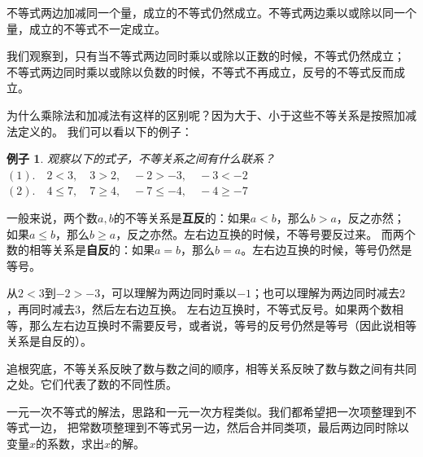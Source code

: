 \documentclass[12pt,UTF8]{ctexbook}
\newtheorem{ex}{例子}[section]
\begin{document}
不等式两边加减同一个量，成立的不等式仍然成立。不等式两边乘以或除以同一个量，成立的不等式不一定成立。

我们观察到，只有当不等式两边同时乘以或除以正数的时候，不等式仍然成立；
不等式两边同时乘以或除以负数的时候，不等式不再成立，反号的不等式反而成立。

为什么乘除法和加减法有这样的区别呢？因为大于、小于这些不等关系是按照加减法定义的。
我们可以看以下的例子：
\begin{ex}\label{ex:4-1-20}
    观察以下的式子，不等关系之间有什么联系？\\
    $(1).\quad 2 < 3, \quad 3 > 2, \quad -2 > -3, \quad -3 < -2$ \\
    $(2). \quad 4 \leqslant 7, \quad 7 \geqslant 4, \quad -7 \leqslant -4, \quad -4 \geqslant -7$
\end{ex}
一般来说，两个数$a,b$的不等关系是\textbf{互反}的：如果$a < b$，那么$b > a$，反之亦然；
如果$a \leqslant b$，那么$b \geqslant a$，反之亦然。左右边互换的时候，不等号要反过来。
而两个数的相等关系是\textbf{自反}的：如果$a = b$，那么$b = a$。左右边互换的时候，等号仍然是等号。

从$2 < 3$到$-2 > -3$，可以理解为两边同时乘以$-1$；也可以理解为两边同时减去$2$，再同时减去$3$，然后左右边互换。
左右边互换时，不等式反号。如果两个数相等，那么左右边互换时不需要反号，或者说，等号的反号仍然是等号（因此说相等关系是自反的）。

追根究底，不等关系反映了数与数之间的顺序，相等关系反映了数与数之间有共同之处。它们代表了数的不同性质。

一元一次不等式的解法，思路和一元一次方程类似。我们都希望把一次项整理到不等式一边，
把常数项整理到不等式另一边，然后合并同类项，最后两边同时除以变量$x$的系数，求出$x$的解。
\end{document}
